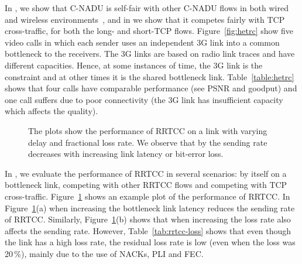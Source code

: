 In , we show that C-NADU is self-fair with other C-NADU flows
in both wired and wireless environments~\cite{singh:2010.thesis}, and in
 we show that it competes fairly with TCP cross-traffic, for both
the long- and short-TCP flows. Figure~\ref{fig:hetrc} show five video calls in which
each sender uses an independent 3G link into a common bottleneck to the
receivers. The 3G links are based on radio link traces and have different
capacities. Hence, at some instances of time, the 3G link is the constraint and
at other times it is the shared bottleneck link. Table~\ref{table:hetrc} shows that
four calls have comparable performance (see PSNR and goodput) and one call suffers
due to poor connectivity (the 3G link has insufficient capacity which affects
the quality).

\begin{figure}[!t]
  \centerline{
   }
   \centerline{
  }
  \caption{The plots show the performance of RRTCC on a link with varying
  delay and fractional loss rate. We observe that by the sending rate
  decreases with increasing link latency or bit-error loss. }
  \label{fig:rrtcc-single}
\end{figure}

\begin{table}[!t]
\begin{center}{
  }
\end{center}
\caption{RRTCC: Metrics for a bottleneck with different packet loss rates.}
\label{tab:rrtcc-loss}
\end{table}

In , we evaluate the performance of RRTCC in several
scenarios: by itself on a bottleneck link, competing with other RRTCC flows
and competing with TCP cross-traffic. Figure~\ref{fig:rrtcc-single} shows an
example plot of the performance of RRTCC. In Figure~\ref{fig:rrtcc-single}(a) when
increasing the bottleneck link latency reduces the sending rate of RRTCC.
Similarly, Figure~\ref{fig:rrtcc-single}(b) shows that when increasing the loss
rate also affects the sending rate. However, Table~\ref{tab:rrtcc-loss} shows
that even though the link has a high loss rate, the residual loss rate is low
(even when the loss was 20\,\%), mainly due to the use of NACKs, PLI and FEC.



